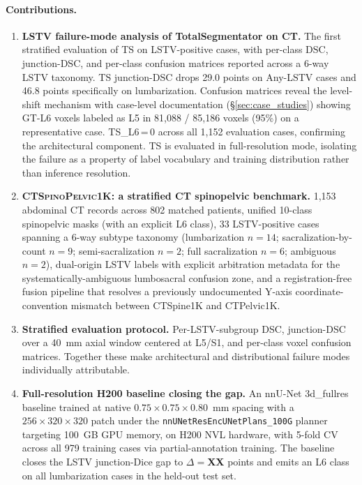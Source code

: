 \documentclass{article}
\newcommand{\dataset}{\textsc{CTSpinoPelvic1K}}
\newcommand{\TS}{TotalSegmentator}
\begin{document}
\paragraph{Contributions.}
\begin{enumerate}
\item \textbf{LSTV failure-mode analysis of \TS{} on CT.}
  The first stratified evaluation of TS on LSTV-positive cases,
  with per-class DSC, junction-DSC, and per-class confusion
  matrices reported across a 6-way LSTV taxonomy.
  TS junction-DSC drops 29.0 points on Any-LSTV cases and 46.8
  points specifically on lumbarization. Confusion matrices reveal
  the level-shift mechanism with case-level documentation
  (\S\ref{sec:case_studies}) showing GT-L6 voxels labeled as L5
  in 81{,}088 / 85{,}186 voxels (95\%) on a representative case.
  \textsc{TS\_L6}\,=\,0 across all 1{,}152 evaluation cases,
  confirming the architectural component.
  TS is evaluated in full-resolution mode, isolating the failure
  as a property of label vocabulary and training distribution
  rather than inference resolution.
\item \textbf{\dataset{}: a stratified CT spinopelvic benchmark.}
  1{,}153 abdominal CT records across 802 matched patients,
  unified 10-class spinopelvic masks (with an explicit L6 class),
  33 LSTV-positive cases spanning a 6-way subtype taxonomy
  (lumbarization $n=14$; sacralization-by-count $n=9$;
  semi-sacralization $n=2$; full sacralization $n=6$;
  ambiguous $n=2$), dual-origin LSTV labels with
  explicit arbitration metadata for the systematically-ambiguous
  lumbosacral confusion zone, and a registration-free fusion
  pipeline that resolves a previously undocumented Y-axis
  coordinate-convention mismatch between CTSpine1K and CTPelvic1K.
\item \textbf{Stratified evaluation protocol.}
  Per-LSTV-subgroup DSC, junction-DSC over a 40~mm axial window
  centered at L5/S1, and per-class voxel confusion matrices.
  Together these make architectural and distributional failure
  modes individually attributable.
\item \textbf{Full-resolution H200 baseline closing the gap.}
  An nnU-Net 3d\_fullres baseline trained at native
  $0.75\!\times\!0.75\!\times\!0.80$~mm spacing with a
  $256\!\times\!320\!\times\!320$ patch under the
  \texttt{nnUNetResEncUNetPlans\_100G} planner targeting 100~GB
  GPU memory, on H200 NVL hardware, with 5-fold CV across all
  979 training cases via partial-annotation training.
  The baseline closes the LSTV junction-Dice gap to
  $\Delta = $\textbf{XX} points and emits an L6 class on all
  lumbarization cases in the held-out test set.
\end{enumerate}
\end{document}
